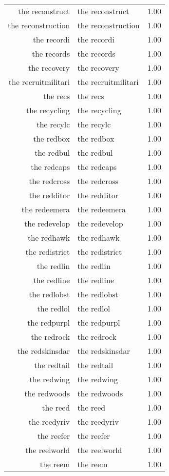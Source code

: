 \begin{table}[ht]
\begin{tabular}{rlr}
  the reconstruct & the reconstruct & 1.00 \\ 
  the reconstruction & the reconstruction & 1.00 \\ 
  the recordi & the recordi & 1.00 \\ 
  the records & the records & 1.00 \\ 
  the recovery & the recovery & 1.00 \\ 
  the recruitmilitari & the recruitmilitari & 1.00 \\ 
  the recs & the recs & 1.00 \\ 
  the recycling & the recycling & 1.00 \\ 
  the recylc & the recylc & 1.00 \\ 
  the redbox & the redbox & 1.00 \\ 
  the redbul & the redbul & 1.00 \\ 
  the redcaps & the redcaps & 1.00 \\ 
  the redcross & the redcross & 1.00 \\ 
  the redditor & the redditor & 1.00 \\ 
  the redeemera & the redeemera & 1.00 \\ 
  the redevelop & the redevelop & 1.00 \\ 
  the redhawk & the redhawk & 1.00 \\ 
  the redistrict & the redistrict & 1.00 \\ 
  the redlin & the redlin & 1.00 \\ 
  the redline & the redline & 1.00 \\ 
  the redlobst & the redlobst & 1.00 \\ 
  the redlol & the redlol & 1.00 \\ 
  the redpurpl & the redpurpl & 1.00 \\ 
  the redrock & the redrock & 1.00 \\ 
  the redskinsdar & the redskinsdar & 1.00 \\ 
  the redtail & the redtail & 1.00 \\ 
  the redwing & the redwing & 1.00 \\ 
  the redwoods & the redwoods & 1.00 \\ 
  the reed & the reed & 1.00 \\ 
  the reedyriv & the reedyriv & 1.00 \\ 
  the reefer & the reefer & 1.00 \\ 
  the reelworld & the reelworld & 1.00 \\ 
  the reem & the reem & 1.00 \\ 

\end{tabular}
\end{table}
